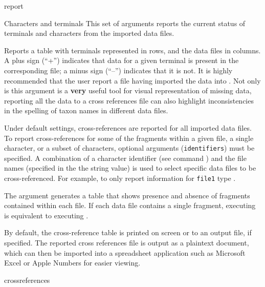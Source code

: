 \begin{command}{report}{}
\begin{arguments}
\begin{argumentgroup}{Characters and terminals}
{This set of arguments reports the current status of terminals and
characters from the imported data files. }


{Reports a table with terminals represented in rows, and the
data files in columns. A plus sign (``+'') indicates that data for a given
terminal is present in the corresponding file; a minus sign (``--'') indicates that it is
not. It is highly recommended that the user report a 
file having imported the data into \poy. Not only is this argument is a {\bf very} 
useful tool for visual representation of missing data, reporting all the data to a 
cross references file can also highlight inconsistencies in the spelling 
of taxon names in different data files.

\setlength{\parindent}{0.5cm}                
\indent 
Under default settings, cross-references are reported for
all imported data files. To report cross-references for some of
the fragments within a given file, a single character, or a subset
of characters, optional arguments (\texttt{identifiers}) must be specified. A combination of
a character identifier (see command ) and
the file names (specified in the the string value) is used to select specific
data files to be cross-referenced. For example, to only report information 
for \texttt{file1} type .

\setlength{\parindent}{0.5cm}                
\indent 
The argument  generates
a table that shows presence and absence of fragments contained
within each file. If each data file contains a
single fragment, executing 
is equivalent to executing .

By default, the cross-reference table is printed on screen or to an
output file, if specified. The reported cross references file is output 
as a plaintext  document, which can then be imported into a 
spreadsheet application such as Microsoft Excel or Apple Numbers 
for easier viewing.}
{crossreferences}


\end{argumentgroup}
\end{arguments}
\end{command}
